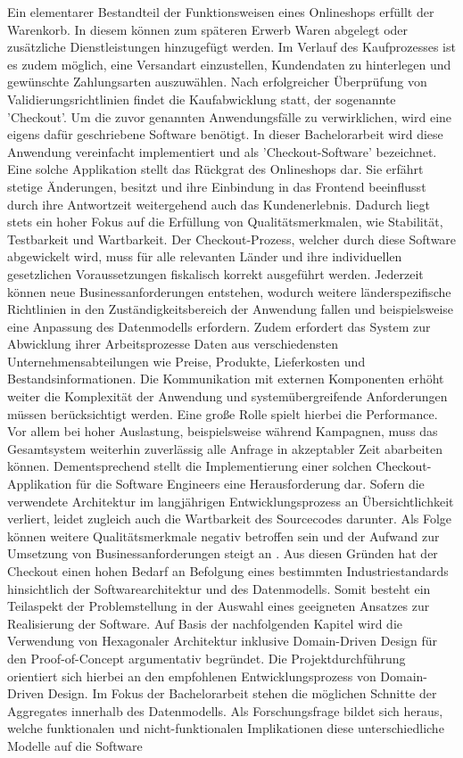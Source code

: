 Ein elementarer Bestandteil der Funktionsweisen eines Onlineshops erfüllt der Warenkorb. In diesem können zum späteren Erwerb Waren abgelegt oder zusätzliche Dienstleistungen hinzugefügt werden. Im Verlauf des Kaufprozesses ist es zudem möglich, eine Versandart einzustellen, Kundendaten zu hinterlegen und gewünschte Zahlungsarten auszuwählen. Nach erfolgreicher Überprüfung von Validierungsrichtlinien findet die Kaufabwicklung statt, der sogenannte 'Checkout'. Um die zuvor genannten Anwendungsfälle zu verwirklichen, wird eine eigens dafür geschriebene Software benötigt. In dieser Bachelorarbeit wird diese Anwendung vereinfacht implementiert und als 'Checkout-Software' bezeichnet. Eine solche Applikation stellt das Rückgrat des Onlineshops dar. Sie erfährt stetige Änderungen, besitzt  und ihre Einbindung in das Frontend beeinflusst durch ihre Antwortzeit weitergehend auch das Kundenerlebnis. Dadurch liegt stets ein hoher Fokus auf die Erfüllung von Qualitätsmerkmalen, wie Stabilität, Testbarkeit und Wartbarkeit. Der Checkout-Prozess, welcher durch diese Software abgewickelt wird, muss für alle relevanten Länder und ihre individuellen gesetzlichen Voraussetzungen fiskalisch korrekt ausgeführt werden. Jederzeit können neue Businessanforderungen entstehen, wodurch weitere länderspezifische Richtlinien in den Zuständigkeitsbereich der Anwendung fallen und beispielsweise eine Anpassung des Datenmodells erfordern. Zudem erfordert das System zur Abwicklung ihrer Arbeitsprozesse Daten aus verschiedensten Unternehmensabteilungen wie Preise, Produkte, Lieferkosten und Bestandsinformationen. Die Kommunikation mit externen Komponenten erhöht weiter die Komplexität der Anwendung und systemübergreifende Anforderungen müssen berücksichtigt werden. Eine große Rolle spielt hierbei die Performance. Vor allem bei hoher Auslastung, beispielsweise während Kampagnen, muss das Gesamtsystem weiterhin zuverlässig alle Anfrage in akzeptabler Zeit abarbeiten können. Dementsprechend stellt die Implementierung einer solchen Checkout-Applikation für die Software Engineers eine Herausforderung dar. Sofern die verwendete Architektur im langjährigen Entwicklungsprozess an Übersichtlichkeit verliert, leidet zugleich auch die Wartbarkeit des Sourcecodes darunter. Als Folge können weitere Qualitätsmerkmale negativ betroffen sein und der Aufwand zur Umsetzung von Businessanforderungen steigt an \cite[S. 3f.]{Pigoski.2001}. Aus diesen Gründen hat der Checkout einen hohen Bedarf an Befolgung eines bestimmten Industriestandards hinsichtlich der Softwarearchitektur und des Datenmodells. Somit besteht ein Teilaspekt der Problemstellung in der Auswahl eines geeigneten Ansatzes zur Realisierung der Software. Auf Basis der nachfolgenden Kapitel wird die Verwendung von Hexagonaler Architektur inklusive Domain-Driven Design für den Proof-of-Concept argumentativ begründet. Die Projektdurchführung orientiert sich hierbei an den empfohlenen Entwicklungsprozess von Domain-Driven Design. Im Fokus der Bachelorarbeit stehen die möglichen Schnitte der Aggregates innerhalb des Datenmodells. Als Forschungsfrage bildet sich heraus, welche funktionalen und nicht-funktionalen Implikationen diese unterschiedliche Modelle auf die Software 